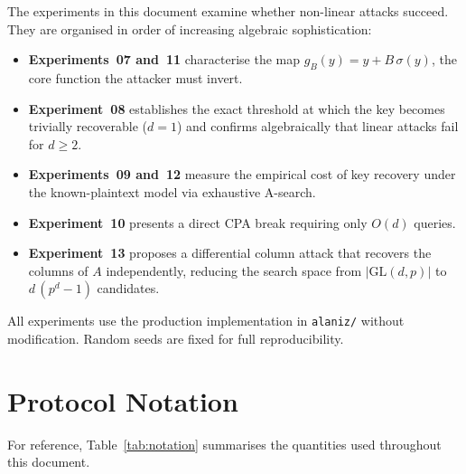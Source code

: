 \documentclass[12pt,a4paper]{article}
\theoremstyle{definition}
\newcommand{\GL}{\mathrm{GL}}
\begin{document}
The experiments in this document examine whether non-linear attacks
succeed. They are organised in order of increasing algebraic
sophistication:

\begin{itemize}
  \item \textbf{Experiments~07 and~11} characterise the map
    $g_B(y) = y + B\,\sigma(y)$, the core function the attacker
    must invert.
  \item \textbf{Experiment~08} establishes the exact threshold at
    which the key becomes trivially recoverable ($d = 1$) and
    confirms algebraically that linear attacks fail for $d \geq 2$.
  \item \textbf{Experiments~09 and~12} measure the empirical cost of
    key recovery under the known-plaintext model via exhaustive
    A-search.
  \item \textbf{Experiment~10} presents a direct CPA break requiring
    only $O(d)$ queries.
  \item \textbf{Experiment~13} proposes a differential column attack
    that recovers the columns of $A$ independently, reducing the
    search space from $|\GL(d,p)|$ to $d\,(p^d - 1)$ candidates.
\end{itemize}

All experiments use the production implementation in \texttt{alaniz/}
without modification. Random seeds are fixed for full reproducibility.

\section{Protocol Notation}

For reference, Table~\ref{tab:notation} summarises the quantities
used throughout this document.
\end{document}
